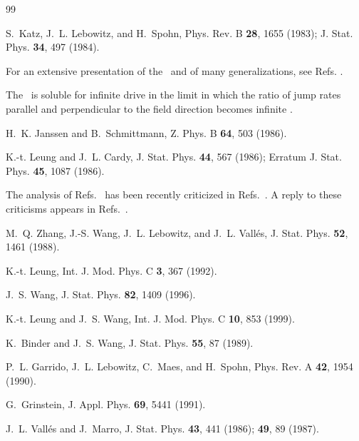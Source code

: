 \documentclass[12pt]{article}
\begin{document}
\begin{thebibliography}{99}

S.~Katz, J.~L. Lebowitz, and H.~Spohn,
Phys. Rev. B {\bf 28}, 1655 (1983);
J. Stat. Phys. {\bf 34}, 497 (1984).

For an extensive presentation of the \dlg\
and of many generalizations, see Refs. \cite{Schmittmann95,MarroDickman}.

The \dlg\ is soluble for infinite drive in the limit in which the ratio of 
jump rates parallel and perpendicular to the field direction becomes infinite 
\cite{vB-S-84}.

H.~K. Janssen and B.~Schmittmann,
\newblock Z. Phys. B {\bf 64}, 503 (1986).

K.-t. Leung and J.~L. Cardy,
\newblock J. Stat. Phys. {\bf 44}, 567 (1986);
Erratum J. Stat. Phys. {\bf 45}, 1087 (1986).

The analysis of Refs.~\cite{Janssen86a,Leung86} has been
recently criticized in Refs.~\cite{Garrido98,Garrido99,Garrido00}. 
A reply to these
criticisms appears in Refs.~\cite{Viability99,leung00}.

M.~Q. Zhang, J.-S. Wang, J.~L. Lebowitz, and J.~L. Vall\'es,
\newblock J. Stat. Phys. {\bf 52}, 1461 (1988).

K.-t. Leung,
\newblock Int. J. Mod. Phys. C {\bf 3}, 367 (1992).

J.~S. Wang,
\newblock J. Stat. Phys. {\bf 82}, 1409 (1996).

K.-t. Leung and J.~S. Wang,
\newblock Int. J. Mod. Phys. C {\bf 10}, 853 (1999).

K.~Binder and J.~S. Wang,
\newblock J. Stat. Phys. {\bf 55}, 87 (1989).

P.~L. Garrido, J.~L. Lebowitz, C.~Maes, and H.~Spohn,
\newblock Phys. Rev. A {\bf 42}, 1954 (1990).

G.~Grinstein,
\newblock J. Appl. Phys. {\bf 69}, 5441 (1991).

J.~L. Vall\'es and J.~Marro,
\newblock J. Stat. Phys. {\bf 43}, 441 (1986);
{\bf 49}, 89 (1987).


\end{thebibliography}
\end{document}
